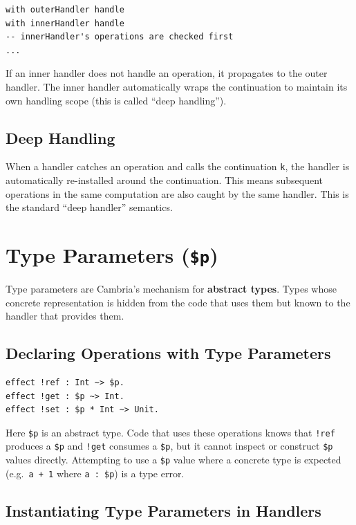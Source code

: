 \documentclass[11pt,a4paper]{article}
\newcommand{\cba}[1]{\lstinline[style=cbainline]{#1}}
\begin{document}
\begin{lstlisting}
with outerHandler handle
with innerHandler handle
-- innerHandler's operations are checked first
...
\end{lstlisting}

If an inner handler does not handle an operation, it propagates to the outer
handler.  The inner handler automatically wraps the continuation to maintain
its own handling scope (this is called ``deep handling'').

\subsection{Deep Handling}

When a handler catches an operation and calls the continuation \texttt{k}, the
handler is automatically re-installed around the continuation.  This means
subsequent operations in the same computation are also caught by the same
handler.  This is the standard ``deep handler'' semantics.

\section{Type Parameters (\texttt{\$p})}
\label{sec:typeparams}

Type parameters are Cambria's mechanism for \textbf{abstract types}. Types
whose concrete representation is hidden from the code that uses them but known
to the handler that provides them.

\subsection{Declaring Operations with Type Parameters}

\begin{lstlisting}
effect !ref : Int ~> $p.
effect !get : $p ~> Int.
effect !set : $p * Int ~> Unit.
\end{lstlisting}

Here \texttt{\$p} is an abstract type.  Code that uses these operations knows
that \cba{!ref} produces a \texttt{\$p} and \cba{!get} consumes a
\texttt{\$p}, but it cannot inspect or construct \texttt{\$p} values directly.
Attempting to use a \texttt{\$p} value where a concrete type is expected
(e.g.\ \texttt{a + 1} where \texttt{a : \$p}) is a type error.

\subsection{Instantiating Type Parameters in Handlers}
\end{document}
